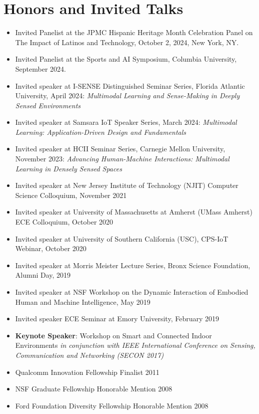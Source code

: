 \documentclass[12pt]{article}
\begin{document}
\section{Honors and Invited Talks}
\begin{itemize}
    \item Invited Panelist at the JPMC Hispanic Heritage Month Celebration Panel on The Impact of Latinos and Technology, October 2, 2024, New York, NY.
    \item Invited Panelist at the Sports and AI Symposium, Columbia University, September 2024.
    \item Invited speaker at I-SENSE Distinguished Seminar Series, Florida Atlantic University, April 2024: \emph{Multimodal Learning and Sense-Making in Deeply Sensed Environments}
    \item Invited speaker at Samsara IoT Speaker Series, March 2024: \emph{Multimodal Learning: Application-Driven Design and Fundamentals}
    \item Invited speaker at HCII Seminar Series, Carnegie Mellon University, November 2023: \emph{Advancing Human-Machine Interactions: Multimodal Learning in Densely Sensed Spaces}
    \item Invited speaker at New Jersey Institute of Technology (NJIT) Computer Science Colloquium, November 2021
    \item Invited speaker at University of Massachusetts at Amherst (UMass Amherst) ECE Colloquium, October 2020
    \item Invited speaker at University of Southern California (USC), CPS-IoT Webinar, October 2020
    \item Invited speaker at Morris Meister Lecture Series, Bronx Science Foundation, Alumni Day, 2019
    \item Invited speaker at NSF Workshop on the Dynamic Interaction of Embodied Human and Machine Intelligence, May 2019
    \item Invited speaker ECE Seminar at Emory University, February 2019
    \item {\bf Keynote Speaker}: Workshop on Smart and Connected Indoor Environments \emph{in conjunction with IEEE International Conference on Sensing, Communication and Networking (SECON 2017)}
    \item Qualcomm Innovation Fellowship Finalist 2011
    \item NSF Graduate Fellowship Honorable Mention 2008
    \item Ford Foundation Diversity Fellowship Honorable Mention 2008
\end{itemize}
\end{document}
